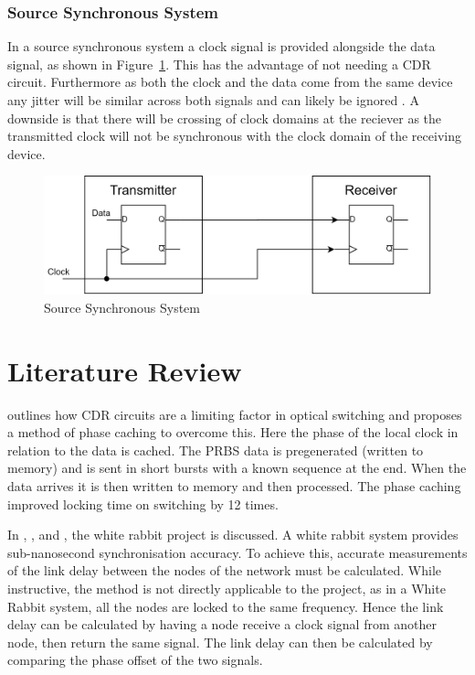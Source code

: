 \subsubsection{Source Synchronous System}%
\label{ssub:source_synchronous_system}
In a source synchronous system a clock signal is provided alongside the data
signal, as shown in Figure~\ref{fig:source_sync}. This has the advantage of not
needing a CDR circuit. Furthermore as both the clock and the data come from the
same device any jitter will be similar across both signals and can likely be
ignored \cite{ragab2011receiver}.   A downside is that there will be crossing
of clock domains at the reciever as the transmitted clock will not be
synchronous with the clock domain of the receiving device.
\begin{figure}[ht]
    \centering
    \includegraphics[width=0.8\linewidth]{img/source_sync.png}
    \caption{Source Synchronous System}%
    \label{fig:source_sync}
\end{figure}

\section{Literature Review}%
\label{sec:literature_review}

\noindent \cite{kari_phase} outlines how CDR circuits are a limiting factor in
optical switching and proposes a method of phase caching to overcome this.
Here the phase of the local clock in relation to the data is cached.  The PRBS
data is pregenerated (written to memory) and is sent in short bursts with a
known sequence at the end. When the data arrives it is then written to memory
and then processed.  The phase caching improved locking time on switching by 12
times.

\noindent In \cite{serrano2013white}, \cite{moreira2010digital}, and
\cite{moreira2009white}, the white rabbit project is discussed. A white rabbit
system provides sub-nanosecond synchronisation accuracy. To achieve this,
accurate measurements of the link delay between the nodes of the network must
be calculated.  While instructive, the method is not directly applicable to the
project, as in a White Rabbit system, all the nodes are locked to the same
frequency. Hence the link delay can be calculated by having a node receive a
clock signal from another node, then return the same signal. The link delay can
then be calculated by comparing the phase offset of the two signals.

